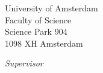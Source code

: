 \begin{center}
University of Amsterdam\\
Faculty of Science\\
Science Park 904\\
1098 XH Amsterdam

\vspace{2cm}

\emph{Supervisor}\\

\theSupervisor

\vspace{0.25cm}

\theInstitute

\vspace{1.0cm}

\theDate

\end{center}
\newpage

\setcounter{page}{1}
